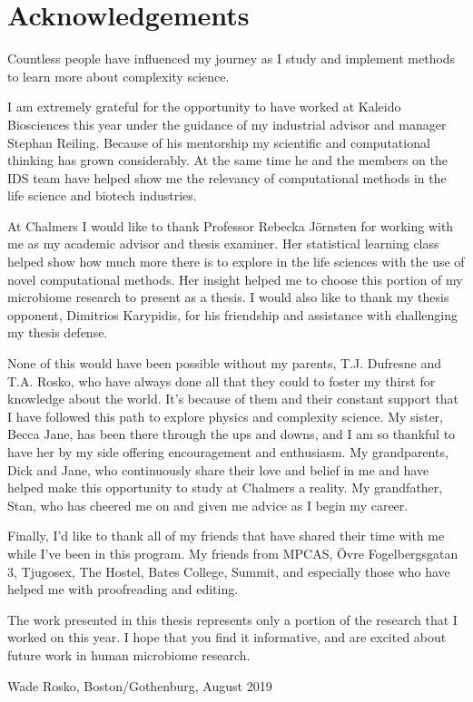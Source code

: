 
\thispagestyle{plain}			%
\section*{Acknowledgements}
Countless people have influenced my journey as I study and implement methods to learn more about complexity science. 
\medskip

I am extremely grateful for the opportunity to have worked at Kaleido Biosciences this year under the guidance of my industrial advisor and manager Stephan Reiling. Because of his mentorship my scientific and computational thinking has grown considerably. At the same time he and the members on the IDS team have helped show me the relevancy of computational methods in the life science and biotech industries. 

\medskip
At Chalmers I would like to thank Professor Rebecka J\"{o}rnsten for working with me as my academic advisor and thesis examiner. Her statistical learning class helped show how much more there is to explore in the life sciences with the use of novel computational methods. Her insight helped me to choose this portion of my microbiome research to present as a thesis. 
I would also like to thank my thesis opponent, Dimitrios Karypidis, for his friendship and assistance with challenging my thesis defense.

\medskip
None of this would have been possible without my parents, T.J. Dufresne and T.A. Rosko, who have always done all that they could to foster my thirst for knowledge about the world. It's because of them and their constant support that I have followed this path to explore physics and complexity science. My sister, Becca Jane, has been there through the ups and downs, and I am so thankful to have her by my side offering encouragement and enthusiasm. My grandparents, Dick and Jane, who continuously share their love and belief in me and have helped make this opportunity to study at Chalmers a reality. My grandfather, Stan, who has cheered me on and given me advice as I begin my career. 

\medskip
Finally, I'd like to thank all of my friends that have shared their time with me while I've been in this program. My friends from MPCAS, \"{O}vre Fogelbergsgatan 3, Tjugosex, The Hostel, Bates College, Summit, and especially those who have helped me with proofreading and editing. 

\medskip

The work presented in this thesis represents only a portion of the research that I worked on this year. I hope that you find it informative, and are excited about future work in human microbiome research. 

\vspace{1.5cm}
\hfill
Wade Rosko, Boston/Gothenburg, August 2019

\newpage				%
\thispagestyle{empty}
\mbox{}
